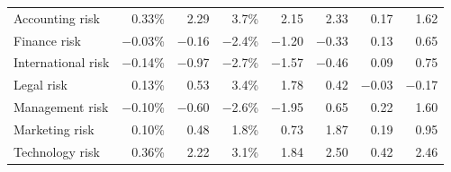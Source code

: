 \begin{tabular}{lrrrrrrr}
Accounting risk & 0.33\% & 2.29 & 3.7\% & 2.15 & 2.33 & 0.17 & 1.62 \\
Finance risk & \ensuremath{-}0.03\% & \ensuremath{-}0.16 & \ensuremath{-}2.4\% & \ensuremath{-}1.20 & \ensuremath{-}0.33 & 0.13 & 0.65 \\
International risk & \ensuremath{-}0.14\% & \ensuremath{-}0.97 & \ensuremath{-}2.7\% & \ensuremath{-}1.57 & \ensuremath{-}0.46 & 0.09 & 0.75 \\
Legal risk & 0.13\% & 0.53 & 3.4\% & 1.78 & 0.42 & \ensuremath{-}0.03 & \ensuremath{-}0.17 \\
Management risk & \ensuremath{-}0.10\% & \ensuremath{-}0.60 & \ensuremath{-}2.6\% & \ensuremath{-}1.95 & 0.65 & 0.22 & 1.60 \\
Marketing risk & 0.10\% & 0.48 & 1.8\% & 0.73 & 1.87 & 0.19 & 0.95 \\
Technology risk & 0.36\% & 2.22 & 3.1\% & 1.84 & 2.50 & 0.42 & 2.46 \\
\bottomrule
\end{tabular}
